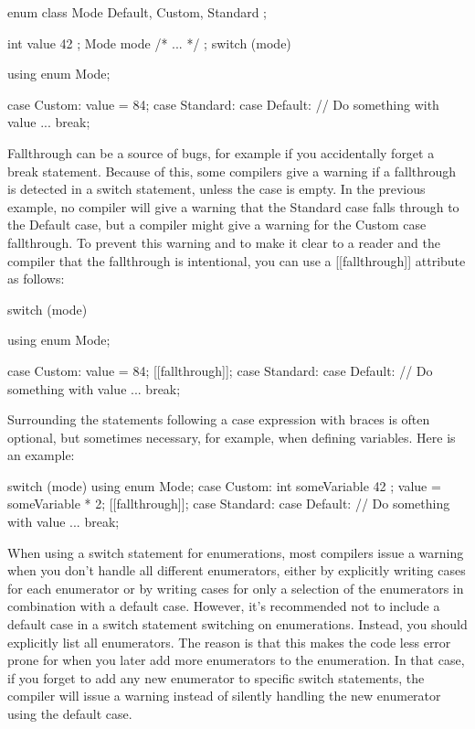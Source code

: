 \begin{cpp}
enum class Mode { Default, Custom, Standard };

int value { 42 };
Mode mode { /* ... */ };
switch (mode) {
    using enum Mode;

    case Custom:
        value = 84;
    case Standard:
    case Default:
        // Do something with value ...
        break;
}
\end{cpp}

Fallthrough can be a source of bugs, for example if you accidentally forget a break statement. Because of this, some compilers give a warning if a fallthrough is detected in a switch statement, unless the case is empty. In the previous example, no compiler will give a warning that the Standard case falls through to the Default case, but a compiler might give a warning for the Custom case fallthrough. To prevent this warning and to make it clear to a reader and the compiler that the fallthrough is intentional, you can use a [[fallthrough]] attribute as follows:

\begin{cpp}
switch (mode) {
    using enum Mode;

    case Custom:
        value = 84;
        [[fallthrough]];
    case Standard:
    case Default:
        // Do something with value ...
        break;
}
\end{cpp}

Surrounding the statements following a case expression with braces is often optional, but sometimes necessary, for example, when defining variables. Here is an example:

\begin{cpp}
switch (mode) {
    using enum Mode;
    case Custom:
        {
            int someVariable { 42 };
            value = someVariable * 2;
            [[fallthrough]];
        }
    case Standard:
    case Default:
        // Do something with value ...
        break;
}
\end{cpp}

When using a switch statement for enumerations, most compilers issue a warning when you don’t handle all different enumerators, either by explicitly writing cases for each enumerator or by writing cases for only a selection of the enumerators in combination with a default case. However, it’s recommended not to include a default case in a switch statement switching on enumerations. Instead, you should explicitly list all enumerators. The reason is that this makes the code less error prone for when you later add more enumerators to the enumeration. In that case, if you forget to add any new enumerator to specific switch statements, the compiler will issue a warning instead of silently handling the new enumerator using the default case.

